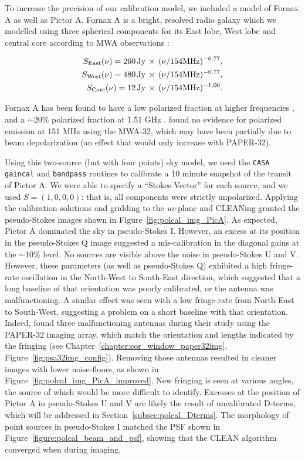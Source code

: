 To increase the precision of our calibration model, we included a model of Fornax A as well as Pictor A. Fornax A is a bright, resolved radio galaxy which we modelled using three spherical components for its East lobe, West lobe and central core according to MWA observations \citep{McKinley.15}:

\begin{eqnarray}
S_{\rm East}(\nu)= 260\,{\rm Jy}\,\times\,(\nu/154{\rm MHz})^{- 0.77},\\
S_{\rm West}(\nu)= 480\,{\rm Jy}\,\times\,(\nu/154{\rm MHz})^{- 0.77},\\
S_{\rm Core}(\nu)= 12\,{\rm Jy}\,\times\,(\nu/154{\rm MHz})^{- 1.00}.\\
\end{eqnarray}

Fornax A has been found to have a low polarized fraction at higher frequencies \citep[20 GHz][]{Lopez-Caniego.09}, and a $\sim20$\% polarized fraction at 1.51 GHz \citep{Fomalont.89}. \cite{Bernardi.13} found no evidence for polarized emission at 151 MHz using the MWA-32, which may have been partially due to beam depolarization (an effect that would only increase with PAPER-32).

Using this two-source (but with four points) sky model, we used the {\tt CASA} {\tt gaincal} and {\tt bandpass} routines to calibrate a 10 minute snapshot of the transit of Pictor A. We were able to specify a ``Stokes Vector'' for each source, and we used $S=(1,0,0,0)$: that is, all components were strictly unpolarized. Applying the calibration solutions and gridding to the \textit{uv}-plane and CLEANing granted the pseudo-Stokes images shown in Figure~\ref{fig:polcal_img_PicA}. As expected, Pictor A dominated the sky in pseudo-Stokes I. However, an excess at its position in the pseudo-Stokes Q image suggested a mis-calibration in the diagonal gains at the $\sim10$\% level. No sources are visible above the noise in pseudo-Stokes U and V. However, these parameters (as well as pseudo-Stokes Q) exhibited a high fringe-rate oscillation in the North-West to South-East direction, which suggested that a long baseline of that orientation was poorly calibrated, or the antenna was malfunctioning. A similar effect was seen with a low fringe-rate from North-East to South-West, suggesting a problem on a short baseline with that orientation. Indeed, \cite{Kohn.16} found three malfunctioning antennas during their study using the PAPER-32 imaging array, which match the orientation and lengths indicated by the fringing (see Chapter~\ref{chapter:eor_window_paper32img}, Figure~\ref{fig:psa32img_config}). Removing those antennas resulted in cleaner images with lower noise-floors, as shown in Figure~\ref{fig:polcal_img_PicA_improved}. New fringing is seen at various angles, the source of which would be more difficult to identify. Excesses at the position of Pictor A in pseudo-Stokes U and V are likely the result of uncalibrated D-terms, which will be addressed in Section~\ref{subsec:polcal_Dterms}.
The morphology of point sources in pseudo-Stokes I matched the PSF shown in Figure~\ref{figure:polcal_beam_and_psf}, showing that the CLEAN algorithm converged when during imaging.

